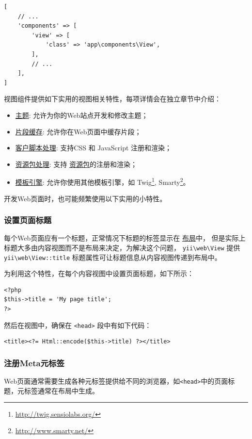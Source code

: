 \lstset{language=php}\begin{lstlisting}
[
    // ...
    'components' => [
        'view' => [
            'class' => 'app\components\View',
        ],
        // ...
    ],
]
\end{lstlisting}
视图组件提供如下实用的视图相关特性，每项详情会在独立章节中介绍：

\begin{itemize}
\item \hyperref[output-theming.md]{主题}: 允许为你的Web站点开发和修改主题；
\item \hyperref[caching-fragment.md]{片段缓存}: 允许你在Web页面中缓存片段；
\item \hyperref[output-client-scripts.md]{客户脚本处理}: 支持CSS 和 JavaScript 注册和渲染；
\item \hyperref[structure-assets.md]{资源包处理}: 支持 \hyperref[structure-assets.md]{资源包}的注册和渲染；
\item \hyperref[tutorial-template-engines.md]{模板引擎}: 允许你使用其他模板引擎，如
Twig\footnote{\url{http://twig.sensiolabs.org/}}, Smarty\footnote{\url{http://www.smarty.net/}}。
\end{itemize}
开发Web页面时，也可能频繁使用以下实用的小特性。

\subsubsection{设置页面标题 \label{structure-views.md::setting-page-titles}}
每个Web页面应有一个标题，正常情况下标题的标签显示在 \hyperref[structure-views.md::::layouts]{布局}中，
但是实际上标题大多由内容视图而不是布局来决定，为解决这个问题， \texttt{yii{\allowbreak{}\textbackslash}web{\allowbreak{}\textbackslash}View} 提供
\texttt{yii{\allowbreak{}\textbackslash}web{\allowbreak{}\textbackslash}View\allowbreak{}::\allowbreak{}title} 标题属性可让标题信息从内容视图传递到布局中。

为利用这个特性，在每个内容视图中设置页面标题，如下所示：

\lstset{language=php}\begin{lstlisting}
<?php
$this->title = 'My page title';
?>
\end{lstlisting}
然后在视图中，确保在 \lstinline|<head>| 段中有如下代码：

\lstset{language=php}\begin{lstlisting}
<title><?= Html::encode($this->title) ?></title>
\end{lstlisting}
\subsubsection{注册Meta元标签 \label{structure-views.md::registering-meta-tags}}
Web页面通常需要生成各种元标签提供给不同的浏览器，如\lstinline|<head>|中的页面标题，元标签通常在布局中生成。

